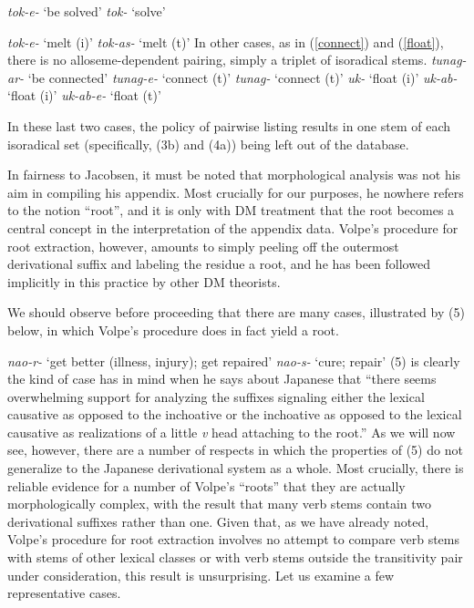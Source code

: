 \documentclass[output=paper,
modfonts
]{LSP/langsci}
\begin{document}
\ea\label{solve}
	\ea \textit{tok-e-} `be solved' 
	\ex \textit{tok-} `solve'
	\z

\ex\label{solve2} 
	\ea \textit{tok-e-} `melt (i)'
	\ex \textit{tok-as-} `melt (t)'
	\z
\z
In other cases, as in (\ref{connect}) and (\ref{float}), there is no alloseme-dependent
pairing, simply a triplet of isoradical stems.
\ea\label{connect}
	\ea \textit{tunag-ar-} `be connected'
	\ex \textit{tunag-e-} `connect (t)'
	\ex \textit{tunag-} `connect (t)'
	\z
\ex\label{float} 
	\ea \textit{uk-} `float (i)'
	\ex \textit{uk-ab-} `float (i)'
	\ex \textit{uk-ab-e-} `float (t)'
	\z
\z

\noindent In these last two cases, the policy of pairwise listing results in one
stem of each isoradical set (specifically, (3b) and (4a)) being left out
of the database.

In fairness to Jacobsen, it must be noted that morphological analysis
was not his aim in compiling his appendix. Most crucially for our
purposes, he nowhere refers to the notion ``root'', and it is only with
 DM treatment that the root becomes a central concept in
the interpretation of the appendix data. Volpe's \citeyearpar[121 (note 27)]{volpe2005a} procedure for root extraction, however, amounts to simply peeling off
the outermost derivational suffix and labeling the residue a root, and
he has been followed implicitly in this practice by other DM theorists.

We should observe before proceeding that there are many cases,
illustrated by (5) below, in which Volpe's procedure does in fact yield
a root.

\ea
	\ea \textit{nao-r-} `get better (illness, injury); get repaired'
	\ex \textit{nao-s-} `cure; repair'
	\z
\z
(5) is clearly the kind of case \citet[106]{marantz2013a} has in mind when he
says about Japanese that ``there seems overwhelming support for
analyzing the suffixes signaling either the lexical causative as opposed
to the inchoative or the inchoative as opposed to the lexical causative
as realizations of a little \textit{v} head attaching to the root.'' As we
will now see, however, there are a number of respects in which the
properties of (5) do not generalize to the Japanese derivational system
as a whole. Most crucially, there is reliable evidence for a number of
Volpe's ``roots'' that they are actually morphologically complex, with
the result that many verb stems contain two derivational suffixes rather
than one. Given that, as we have already noted, Volpe's procedure for
root extraction involves no attempt to compare verb stems with stems of
other lexical classes or with verb stems outside the transitivity pair
under consideration, this result is unsurprising. Let us examine a few
representative cases.
\end{document}
